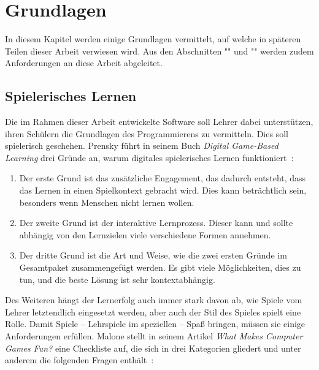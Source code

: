 \chapter{Grundlagen}
\label{sec:basics}

In diesem Kapitel werden einige Grundlagen vermittelt, auf welche in späteren Teilen dieser Arbeit verwiesen wird. Aus den Abschnitten "" und "" werden zudem Anforderungen an diese Arbeit abgeleitet.

\section{Spielerisches Lernen}
\label{sec:basics:playful-learning}

Die im Rahmen dieser Arbeit entwickelte Software soll Lehrer dabei unterstützen, ihren Schülern die Grundlagen des Programmierens zu vermitteln. Dies soll spielerisch geschehen. Prensky führt in seinem Buch \textit{Digital Game-Based Learning} drei Gründe an, warum digitales spielerisches Lernen funktioniert~\cite[147]{prensky2007}:

\begin{enumerate}
    \item Der erste Grund ist das zusätzliche Engagement, das dadurch entsteht, dass das Lernen in einen Spielkontext gebracht wird. Dies kann beträchtlich sein, besonders wenn Menschen nicht lernen wollen.
    \item Der zweite Grund ist der interaktive Lernprozess. Dieser kann und sollte abhängig von den Lernzielen viele verschiedene Formen annehmen.
    \item Der dritte Grund ist die Art und Weise, wie die zwei ersten Gründe im Gesamtpaket zusammengefügt werden. Es gibt viele Möglichkeiten, dies zu tun, und die beste Lösung ist sehr kontextabhängig.
\end{enumerate}

Des Weiteren hängt der Lernerfolg auch immer stark davon ab, wie Spiele vom Lehrer letztendlich eingesetzt werden, aber auch der Stil des Spieles spielt eine Rolle. Damit Spiele -- Lehrspiele im speziellen -- Spaß bringen, müssen sie einige Anforderungen erfüllen. Malone stellt in seinem Artikel \textit{What Makes Computer Games Fun?} eine Checkliste auf, die sich in drei Kategorien gliedert und unter anderem die folgenden Fragen enthält~\cite[49]{malone1981}:

